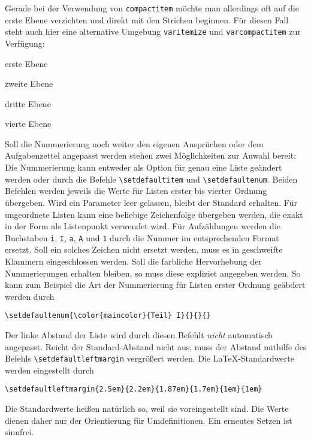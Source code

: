 \documentclass{exercise}
\begin{document}
    Gerade bei der Verwendung von \lstinline{compactitem} möchte man allerdings oft auf die erste Ebene verzichten und direkt mit den Strichen beginnen. Für diesen Fall steht auch hier eine alternative Umgebung \lstinline{varitemize} und \lstinline{varcompactitem} zur Verfügung:
    \begin{varcompactitem}
      \item erste Ebene
        \begin{compactitem}
          \item zweite Ebene
            \begin{compactitem}
              \item dritte Ebene
                \begin{compactitem}
                  \item vierte Ebene
                \end{compactitem}
            \end{compactitem}
        \end{compactitem}
    \end{varcompactitem}

    Soll die Nummerierung noch weiter den eigenen Ansprüchen oder dem Aufgabenzettel angepasst werden stehen zwei Möglichkeiten zur Auwahl bereit: Die Nummerierung kann entweder als Option für genau eine Liste geändert werden oder durch die Befehle \lstinline-\setdefaultitem- und \lstinline-\setdefaultenum-. Beiden Befehlen werden jeweils die Werte für Listen erster bis vierter Ordnung übergeben. Wird ein Parameter leer gelassen, bleibt der Standard erhalten. Für ungeordnete Listen kann eine beliebige Zeichenfolge übergeben werden, die exakt in der Form als Listenpunkt verwendet wird. Für Aufzählungen werden die Buchstaben \texttt{i}, \texttt{I}, \texttt{a}, \texttt{A} und \texttt{1} durch die Nummer im entsprechenden Format ersetzt. Soll ein solches Zeichen nicht ersetzt werden, muss es in geschweifte Klammern eingeschlossen werden. Soll die farbliche Hervorhebung der Nummerierungen erhalten bleiben, so muss diese expliziet angegeben werden. So kann zum Beispiel die Art der Nummerierung für Listen erster Ordnung geäbdert werden durch
    \begin{lstlisting}[gobble=6]
      \setdefaultenum{\color{maincolor}{Teil} I}{}{}{}
    \end{lstlisting}
    Der linke Abstand der Liste wird durch diesen Befehlt \emph{nicht} automatisch angepasst. Reicht der Standard-Abstand nicht aus, muss der Abstand mithilfe des Befehls \lstinline-\setdefaultleftmargin- vergrößert werden. Die \LaTeX{}-Standardwerte werden eingestellt durch
    \begin{lstlisting}[gobble=6]
      \setdefaultleftmargin{2.5em}{2.2em}{1.87em}{1.7em}{1em}{1em}
    \end{lstlisting}
    Die Standardwerte heißen natürlich so, weil sie voreingestellt sind. Die Werte dienen daher nur der Orientierung für Umdefinitionen. Ein erneutes Setzen ist sinnfrei.
\end{document}

